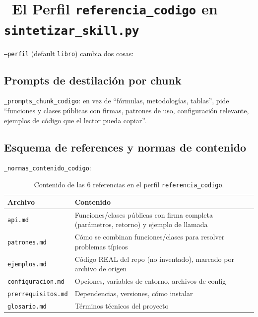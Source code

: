 \documentclass[11pt,a4paper]{article}
\newcommand{\iconotexto}[2]{\textcolor{cyanNeon}{\faIcon{#1}}~#2}
\begin{document}
\section{\iconotexto{microchip}{El Perfil \texttt{referencia\_codigo} en \texttt{sintetizar\_skill.py}}}

\texttt{--perfil} (default \texttt{libro}) cambia dos cosas:

\subsection{Prompts de destilación por chunk}
\texttt{\_prompts\_chunk\_codigo}: en vez de ``fórmulas, metodologías, tablas'', pide
``funciones y clases públicas con firmas, patrones de uso, configuración relevante,
ejemplos de código que el lector pueda copiar''.

\subsection{Esquema de references y normas de contenido}
\texttt{\_normas\_contenido\_codigo}:

\begin{table}[h!]
\centering
\small
\begin{tabularx}{\linewidth}{>{\ttfamily}p{4.2cm} >{\raggedright\arraybackslash}X}
\toprule
\rowcolor{azulNoche!12}\textbf{Archivo} & \textbf{Contenido} \\
\midrule
\texttt{api.md} & Funciones/clases públicas con firma completa (parámetros, retorno) y ejemplo de llamada \\
\midrule
\texttt{patrones.md} & Cómo se combinan funciones/clases para resolver problemas típicos \\
\midrule
\texttt{ejemplos.md} & Código REAL del repo (no inventado), marcado por archivo de origen \\
\midrule
\texttt{configuracion.md} & Opciones, variables de entorno, archivos de config \\
\midrule
\texttt{prerrequisitos.md} & Dependencias, versiones, cómo instalar \\
\midrule
\texttt{glosario.md} & Términos técnicos del proyecto \\
\bottomrule
\end{tabularx}
\caption{Contenido de las 6 referencias en el perfil \texttt{referencia\_codigo}.}
\end{table}
\end{document}
